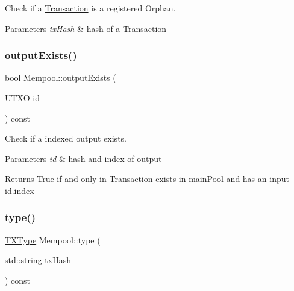 Check if a \mbox{\hyperlink{classTransaction}{Transaction}} is a registered Orphan. 


\begin{DoxyParams}{Parameters}
{\em tx\+Hash} & hash of a \mbox{\hyperlink{classTransaction}{Transaction}} \\
\hline
\end{DoxyParams}
\mbox{\label{classMempool_ad72ddf2809bf532f2b6c0f09922a77db}} 
\subsubsection{\texorpdfstring{output\+Exists()}{outputExists()}}
{\footnotesize\ttfamily bool Mempool\+::output\+Exists (\begin{DoxyParamCaption}\item[{\mbox{\hyperlink{utxo_8hpp_a19091d002da03ec92277e19295ac4540}{U\+T\+XO}}}]{id }\end{DoxyParamCaption}) const}



Check if a indexed output exists. 


\begin{DoxyParams}{Parameters}
{\em id} & hash and index of output \\
\hline
\end{DoxyParams}
\begin{DoxyReturn}{Returns}
True if and only in \mbox{\hyperlink{classTransaction}{Transaction}} exists in main\+Pool and has an input id.\+index 
\end{DoxyReturn}
\mbox{\label{classMempool_a216beee85149f61c603ef8ad5cdd8ef5}} 
\subsubsection{\texorpdfstring{type()}{type()}}
{\footnotesize\ttfamily \mbox{\hyperlink{transaction_8hpp_a379269e60c4ed3fb09a01778f31ddaad}{T\+X\+Type}} Mempool\+::type (\begin{DoxyParamCaption}\item[{std\+::string}]{tx\+Hash }\end{DoxyParamCaption}) const}



